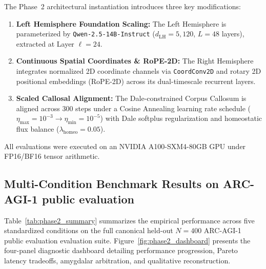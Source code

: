 \documentclass[11pt,a4paper]{article}
\theoremstyle{plain}
\theoremstyle{definition}
\theoremstyle{remark}
\begin{document}
The Phase~2 architectural instantiation introduces three key modifications:
\begin{enumerate}
    \item \textbf{Left Hemisphere Foundation Scaling:} The Left Hemisphere is parameterized by \texttt{Qwen-2.5-14B-Instruct} ($d_{\mathrm{LH}} = 5{,}120$, $L = 48$ layers), extracted at Layer $\ell = 24$.
    \item \textbf{Continuous Spatial Coordinates \& RoPE-2D:} The Right Hemisphere integrates normalized 2D coordinate channels via \texttt{CoordConv2D} and rotary 2D positional embeddings (RoPE-2D) across its dual-timescale recurrent layers.
    \item \textbf{Scaled Callosal Alignment:} The Dale-constrained Corpus Callosum is aligned across 300 steps under a Cosine Annealing learning rate schedule ($\eta_{\max} = 10^{-3} \to \eta_{\min} = 10^{-5}$) with Dale softplus regularization and homeostatic flux balance ($\lambda_{\mathrm{homeo}} = 0.05$).
\end{enumerate}

All evaluations were executed on an NVIDIA A100-SXM4-80GB GPU under FP16/BF16 tensor arithmetic.

\subsection{Multi-Condition Benchmark Results on ARC-AGI-1 public evaluation}

Table~\ref{tab:phase2_summary} summarizes the empirical performance across five standardized conditions on the full canonical held-out $N = 400$ ARC-AGI-1 public evaluation evaluation suite. Figure~\ref{fig:phase2_dashboard} presents the four-panel diagnostic dashboard detailing performance progression, Pareto latency tradeoffs, amygdalar arbitration, and qualitative reconstruction.
\end{document}
